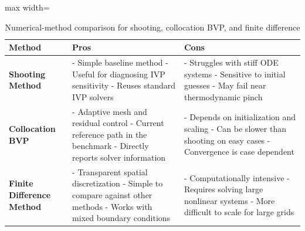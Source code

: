 \begin{table}[ht]
\centering
\scriptsize
\renewcommand{\arraystretch}{1.5}
\caption{Numerical-method comparison for shooting, collocation BVP, and finite difference}
\label{tab:method_comparison_table}
\begin{adjustbox}{max width=\textwidth}
\begin{tabular}{|>{\centering\arraybackslash}m{2.8cm}|p{5.2cm}|p{5.2cm}|}
    \hline
    \textbf{Method} & \textbf{Pros} & \textbf{Cons} \\
    \hline
    \textbf{Shooting Method} &
    - Simple baseline method \newline
    - Useful for diagnosing IVP sensitivity \newline
    - Reuses standard IVP solvers
    &
    - Struggles with stiff ODE systems \newline
    - Sensitive to initial guesses \newline
    - May fail near thermodynamic pinch \\
    \hline
    \textbf{Collocation BVP} &
    - Adaptive mesh and residual control \newline
    - Current reference path in the benchmark \newline
    - Directly reports solver information
    &
    - Depends on initialization and scaling \newline
    - Can be slower than shooting on easy cases \newline
    - Convergence is case dependent \\
    \hline
    \textbf{Finite Difference Method} &
    - Transparent spatial discretization \newline
    - Simple to compare against other methods \newline
    - Works with mixed boundary conditions
    &
    - Computationally intensive \newline
    - Requires solving large nonlinear systems \newline
    - More difficult to scale for large grids \\
    \hline
\end{tabular}
\end{adjustbox}
\end{table}
